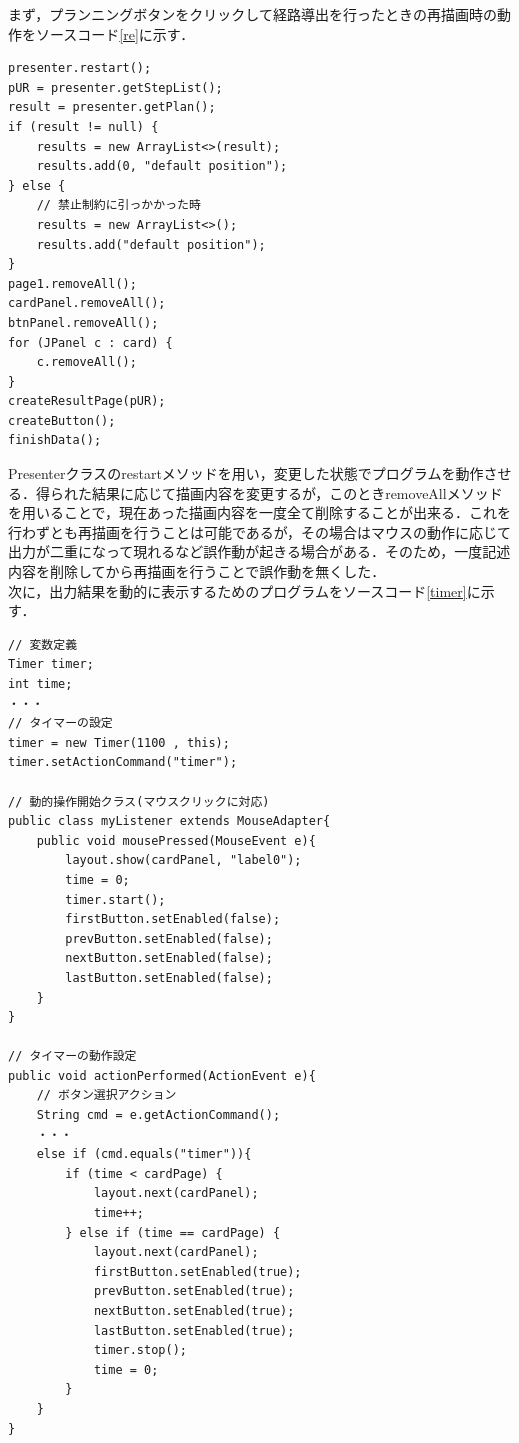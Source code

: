 \documentclass[12pt]{jarticle}
\begin{document}
まず，プランニングボタンをクリックして経路導出を行ったときの再描画時の動作をソースコード\ref{re}に示す．\\

\begin{lstlisting}[caption=再描画時の動作,label=re]
presenter.restart();
pUR = presenter.getStepList();
result = presenter.getPlan();
if (result != null) {
	results = new ArrayList<>(result);
	results.add(0, "default position");
} else {
	// 禁止制約に引っかかった時
	results = new ArrayList<>();
	results.add("default position");
}
page1.removeAll();
cardPanel.removeAll();
btnPanel.removeAll();
for (JPanel c : card) {
	c.removeAll();
}
createResultPage(pUR);
createButton();
finishData();
\end{lstlisting}

Presenterクラスのrestartメソッドを用い，変更した状態でプログラムを動作させる．得られた結果に応じて描画内容を変更するが，このときremoveAllメソッドを用いることで，現在あった描画内容を一度全て削除することが出来る．これを行わずとも再描画を行うことは可能であるが，その場合はマウスの動作に応じて出力が二重になって現れるなど誤作動が起きる場合がある．そのため，一度記述内容を削除してから再描画を行うことで誤作動を無くした．\\

次に，出力結果を動的に表示するためのプログラムをソースコード\ref{timer}に示す．\\

\begin{lstlisting}[caption=動的表示用,label=timer]
// 変数定義
Timer timer;
int time;
・・・
// タイマーの設定
timer = new Timer(1100 , this);
timer.setActionCommand("timer");

// 動的操作開始クラス(マウスクリックに対応)
public class myListener extends MouseAdapter{
	public void mousePressed(MouseEvent e){
		layout.show(cardPanel, "label0");
		time = 0;
		timer.start();
		firstButton.setEnabled(false);
		prevButton.setEnabled(false);
		nextButton.setEnabled(false);
		lastButton.setEnabled(false);
	}
}

// タイマーの動作設定
public void actionPerformed(ActionEvent e){
	// ボタン選択アクション
	String cmd = e.getActionCommand();
	・・・
	else if (cmd.equals("timer")){
		if (time < cardPage) {
			layout.next(cardPanel);
			time++;
		} else if (time == cardPage) {
			layout.next(cardPanel);
			firstButton.setEnabled(true);
			prevButton.setEnabled(true);
			nextButton.setEnabled(true);
			lastButton.setEnabled(true);
			timer.stop();
			time = 0;
		}
	}
}
\end{lstlisting}
\end{document}

